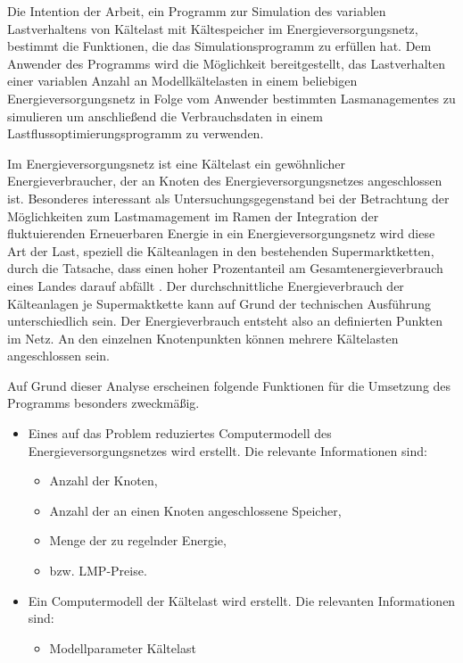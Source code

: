 Die Intention der Arbeit, ein Programm zur Simulation des variablen Lastverhaltens von Kältelast mit Kältespeicher im
Energieversorgungsnetz, bestimmt die Funktionen, die das Simulationsprogramm zu erfüllen hat. Dem Anwender des Programms wird
die Möglichkeit bereitgestellt, das Lastverhalten einer variablen Anzahl an Modellkältelasten in einem beliebigen
Energieversorgungsnetz in Folge vom Anwender bestimmten Lasmanagementes zu simulieren um anschließend die Verbrauchsdaten in
einem Lastflussoptimierungsprogramm zu verwenden.


Im Energieversorgungsnetz ist eine Kältelast ein gewöhnlicher Energieverbraucher, der an Knoten des Energieversorgungsnetzes
angeschlossen ist. Besonderes interessant als Untersuchungsgegenstand bei der Betrachtung der Möglichkeiten zum Lastmamagement
im Ramen der Integration der fluktuierenden Erneuerbaren Energie in ein Energieversorgungsnetz wird diese Art der Last,
speziell die Kälteanlagen in den bestehenden Supermarktketten, durch die Tatsache, dass einen hoher Prozentanteil am
Gesamtenergieverbrauch eines Landes darauf abfällt \cite{doctor}. Der durchschnittliche Energieverbrauch der
Kälteanlagen je Supermaktkette kann auf Grund der technischen Ausführung unterschiedlich sein. Der Energieverbrauch entsteht
also an definierten Punkten im Netz. An den einzelnen Knotenpunkten können mehrere Kältelasten angeschlossen sein.

Auf Grund dieser Analyse erscheinen folgende Funktionen für die Umsetzung des Programms besonders zweckmäßig.

\begin{itemize}
	\item Eines auf das Problem reduziertes Computermodell des Energieversorgungsnetzes wird erstellt. Die relevante
	Informationen sind:
	\begin{itemize}
		\item Anzahl der Knoten,
		\item Anzahl der an einen Knoten angeschlossene Speicher,
		\item Menge der zu regelnder Energie,
		\item bzw. LMP-Preise.
	\end{itemize}
	\item Ein Computermodell der Kältelast wird erstellt. Die relevanten Informationen sind:
	\begin{itemize}
		\item Modellparameter Kältelast
	\end{itemize}
\end{itemize}
